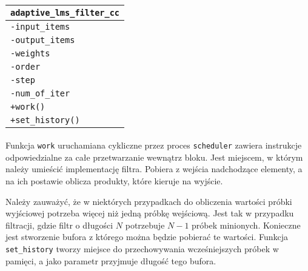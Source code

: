 \paragraph{}
\begin{tabular}{|l|} \hline
\texttt{adaptive\_lms\_filter\_cc} \\
\hline
\texttt{-input\_items} \\
\texttt{-output\_items} \\
\texttt{-weights} \\
\texttt{-order} \\
\texttt{-step} \\
\texttt{-num\_of\_iter} \\
\hline
\texttt{+work()} \\
\texttt{+set\_history()} \\
\hline
\end{tabular}

\paragraph{}
Funkcja \texttt{work} uruchamiana cykliczne przez proces \texttt{scheduler} zawiera instrukcje odpowiedzialne za całe przetwarzanie wewnątrz bloku. 
Jest miejscem, w którym należy umieścić implementację filtra. 
Pobiera z wejścia nadchodzące elementy, a na ich postawie oblicza produkty, które kieruje na wyjście.

Należy zauważyć, że w niektórych przypadkach do obliczenia wartości próbki wyjściowej potrzeba więcej niż jedną próbkę wejściową. 
Jest tak w przypadku filtracji, gdzie filtr o długości $N$ potrzebuje $N-1$ próbek minionych. 
Konieczne jest stworzenie bufora z którego można będzie pobierać te wartości. 
Funkcja \texttt{set\_history} tworzy miejsce do przechowywania wcześniejszych próbek w pamięci, a jako parametr przyjmuje długość tego bufora. 
